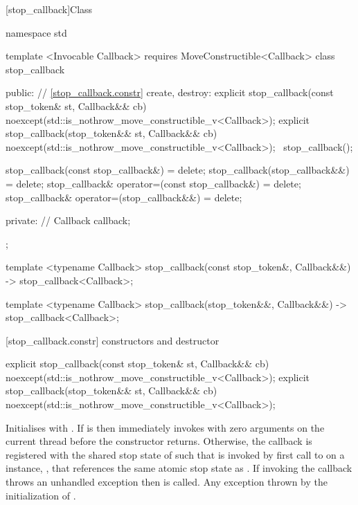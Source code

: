 {%
%
[stop_callback]{Class }

\pnum
{}%

\begin{codeblock}
namespace std {
  template <Invocable Callback>
    requires MoveConstructible<Callback>
  class stop_callback {
  public:
    // \ref{stop_callback.constr} create, destroy:
    explicit stop_callback(const stop_token& st, Callback&& cb)
        noexcept(std::is_nothrow_move_constructible_v<Callback>);
    explicit stop_callback(stop_token&& st, Callback&& cb)
        noexcept(std::is_nothrow_move_constructible_v<Callback>);
    ~stop_callback();

    stop_callback(const stop_callback&) = delete;
    stop_callback(stop_callback&&) = delete;
    stop_callback& operator=(const stop_callback&) = delete;
    stop_callback& operator=(stop_callback&&) = delete;

  private:
    // \expos
    Callback callback; 
  };

  template <typename Callback>
  stop_callback(const stop_token&, Callback&&) -> stop_callback<Callback>;

  template <typename Callback>
  stop_callback(stop_token&&, Callback&&) -> stop_callback<Callback>;
}
\end{codeblock}

[stop_callback.constr]{ constructors and destructor}

%
\begin{itemdecl}
explicit stop_callback(const stop_token& st, Callback&& cb)
  noexcept(std::is_nothrow_move_constructible_v<Callback>);
explicit stop_callback(stop_token&& st, Callback&& cb)
  noexcept(std::is_nothrow_move_constructible_v<Callback>);
\end{itemdecl}
\begin{itemdescr}
  \pnum\effects Initialises  with .
                If  is  then immediately invokes
                with zero arguments on the current thread before the constructor returns.
                Otherwise, the callback is registered with the shared stop state of 
                such that  is invoked by first call to 
                on a  instance, , that references the same atomic stop
                state as .
                If invoking the callback throws an unhandled exception then  is called.
  \pnum\throws Any exception thrown by the initialization of .
\end{itemdescr}

}
